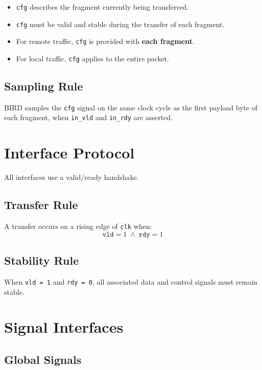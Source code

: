 \documentclass[11pt,a4paper]{article}
\begin{document}
\begin{itemize}
  \item \texttt{cfg} describes the fragment currently being transferred.
  \item \texttt{cfg} must be valid and stable during the transfer of each fragment.
  \item For remote traffic, \texttt{cfg} is provided with \textbf{each fragment}.
  \item For local traffic, \texttt{cfg} applies to the entire packet.
\end{itemize}

\subsection{Sampling Rule}

BIRD samples the \texttt{cfg} signal on the same clock cycle as the first payload byte of each fragment, when \texttt{in\_vld} and \texttt{in\_rdy} are asserted.

\section{Interface Protocol}

All interfaces use a valid/ready handshake.

\subsection{Transfer Rule}
A transfer occurs on a rising edge of \texttt{clk} when:
\[
\texttt{vld} = 1 \;\land\; \texttt{rdy} = 1
\]

\subsection{Stability Rule}
When \texttt{vld = 1} and \texttt{rdy = 0}, all associated data and control signals must remain stable.

\section{Signal Interfaces}

\subsection{Global Signals}
\end{document}
